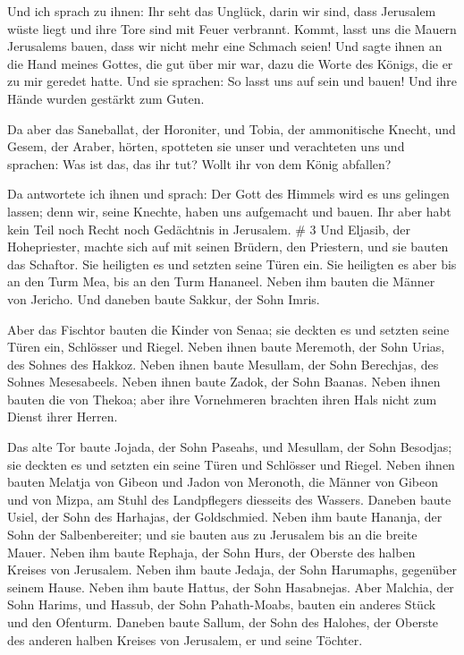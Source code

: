  Und ich sprach zu ihnen: Ihr seht das Unglück, darin wir
sind, dass Jerusalem wüste liegt und ihre Tore sind mit Feuer verbrannt.
Kommt, lasst uns die Mauern Jerusalems bauen, dass wir nicht mehr eine
Schmach seien!  Und sagte ihnen an die Hand meines
Gottes, die gut über mir war, dazu die Worte des Königs, die er zu mir
geredet hatte. Und sie sprachen: So lasst uns auf sein und bauen! Und
ihre Hände wurden gestärkt zum Guten.

 Da aber das Saneballat, der Horoniter, und Tobia, der
ammonitische Knecht, und Gesem, der Araber, hörten, spotteten sie unser
und verachteten uns und sprachen: Was ist das, das ihr tut? Wollt ihr
von dem König abfallen?

 Da antwortete ich ihnen und sprach: Der Gott des Himmels
wird es uns gelingen lassen; denn wir, seine Knechte, haben uns
aufgemacht und bauen. Ihr aber habt kein Teil noch Recht noch Gedächtnis
in Jerusalem. \# 3  Und Eljasib, der Hohepriester, machte
sich auf mit seinen Brüdern, den Priestern, und sie bauten das Schaftor.
Sie heiligten es und setzten seine Türen ein. Sie heiligten es aber bis
an den Turm Mea, bis an den Turm Hananeel.  Neben ihm
bauten die Männer von Jericho. Und daneben baute Sakkur, der Sohn Imris.

 Aber das Fischtor bauten die Kinder von Senaa; sie
deckten es und setzten seine Türen ein, Schlösser und Riegel.
 Neben ihnen baute Meremoth, der Sohn Urias, des Sohnes
des Hakkoz. Neben ihnen baute Mesullam, der Sohn Berechjas, des Sohnes
Mesesabeels. Neben ihnen baute Zadok, der Sohn Baanas. 
Neben ihnen bauten die von Thekoa; aber ihre Vornehmeren brachten ihren
Hals nicht zum Dienst ihrer Herren.

 Das alte Tor baute Jojada, der Sohn Paseahs, und
Mesullam, der Sohn Besodjas; sie deckten es und setzten ein seine Türen
und Schlösser und Riegel.  Neben ihnen bauten Melatja von
Gibeon und Jadon von Meronoth, die Männer von Gibeon und von Mizpa, am
Stuhl des Landpflegers diesseits des Wassers.  Daneben
baute Usiel, der Sohn des Harhajas, der Goldschmied. Neben ihm baute
Hananja, der Sohn der Salbenbereiter; und sie bauten aus zu Jerusalem
bis an die breite Mauer.  Neben ihm baute Rephaja, der
Sohn Hurs, der Oberste des halben Kreises von Jerusalem. 
Neben ihm baute Jedaja, der Sohn Harumaphs, gegenüber seinem Hause.
Neben ihm baute Hattus, der Sohn Hasabnejas.  Aber
Malchia, der Sohn Harims, und Hassub, der Sohn Pahath-Moabs, bauten ein
anderes Stück und den Ofenturm.  Daneben baute Sallum,
der Sohn des Halohes, der Oberste des anderen halben Kreises von
Jerusalem, er und seine Töchter.

